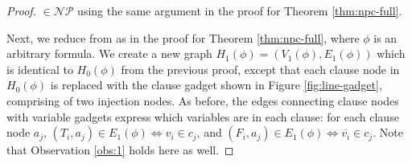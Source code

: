 \begin{proof}
\maxinc $\in \mathcal{NP}$ using the same argument in the proof for Theorem \ref{thm:npc-full}.

Next, we reduce from {\sat} as in the proof for Theorem \ref{thm:npc-full}, where $\phi$ is an arbitrary \sat formula. We create a new graph $H_1(\phi) = (V_1(\phi), E_1(\phi))$ which is identical to $H_0(\phi)$ from the previous proof, except that each clause node in $H_0(\phi)$ is replaced with the clause gadget shown in Figure \ref{fig:line-gadget}, comprising of two injection nodes. As before, the edges connecting clause nodes with variable gadgets express which variables are in each clause: for each clause node $a_j$, $(T_i, a_j)\in E_1(\phi) \Leftrightarrow v_i\in c_j$, and $(F_i, a_j)\in E_1(\phi) \Leftrightarrow \overline{v_i}\in c_j$. Note that Observation \ref{obs:1} holds here as well.






\end{proof}
